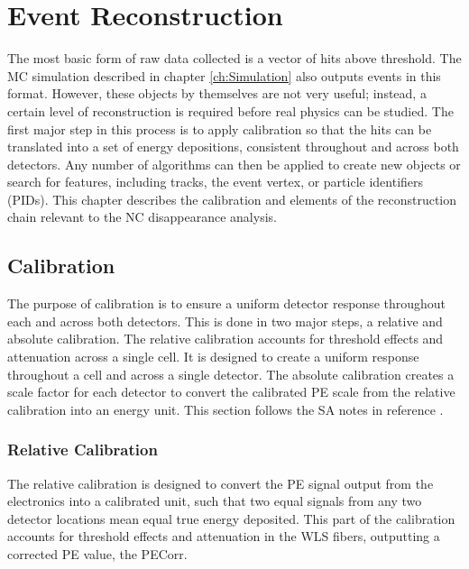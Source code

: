 \chapter{Event Reconstruction}
\label{ch:RecoCal}

The most basic form of raw data collected is a vector of hits above threshold. The MC simulation described in chapter \ref{ch:Simulation} also outputs events in this format. However, these objects by themselves are not very useful; instead, a certain level of reconstruction is required before real physics can be studied. The first major step in this process is to apply calibration so that the hits can be translated into a set of energy depositions, consistent throughout and across both detectors. Any number of algorithms can then be applied to create new objects or search for features, including tracks, the event vertex, or particle identifiers (PIDs). This chapter describes the calibration and elements of the reconstruction chain relevant to the NC disappearance analysis.

\section{Calibration}
\label{sec:Calib}

The purpose of calibration is to ensure a uniform detector response throughout each and across both detectors. This is done in two major steps, a relative and absolute calibration. The relative calibration accounts for threshold effects and attenuation across a single cell. It is designed to create a uniform response throughout a cell and across a single detector. The absolute calibration creates a scale factor for each detector to convert the calibrated PE scale from the relative calibration into an energy unit. This section follows the SA notes in reference \cite{ref:TNCalib}.

\subsection{Relative Calibration}
\label{sec:CalibRel}

The relative calibration is designed to convert the PE signal output from the electronics into a calibrated unit, such that two equal signals from any two detector locations mean equal true energy deposited. This part of the calibration accounts for threshold effects and attenuation in the WLS fibers, outputting a corrected PE value, the PECorr.

